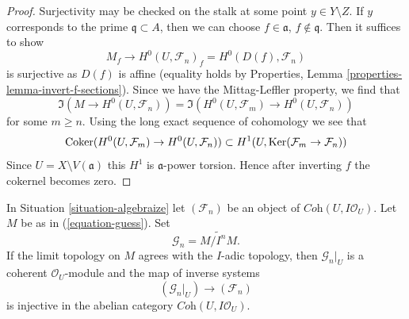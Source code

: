 \begin{proof}
Surjectivity may be checked on the stalk at some point $y \in Y \setminus Z$.
If $y$ corresponds to the prime $\mathfrak q \subset A$, then we can
choose $f \in \mathfrak a$, $f \not \in \mathfrak q$. Then it suffices
to show
$$
M_f \longrightarrow H^0(U, \mathcal{F}_n)_f = H^0(D(f), \mathcal{F}_n)
$$
is surjective as $D(f)$ is affine (equality holds by Properties,
Lemma \ref{properties-lemma-invert-f-sections}). Since we have the
Mittag-Leffler property, we find that
$$
\Im(M \to H^0(U, \mathcal{F}_n)) =
\Im(H^0(U, \mathcal{F}_m) \to H^0(U, \mathcal{F}_n))
$$
for some $m \geq n$. Using the long exact sequence of cohomology we see
that
$$
\mathop{\mathrm{Coker}}(H^0(U, \mathcal{F}_m) \to H^0(U, \mathcal{F}_n))
\subset
H^1(U, \mathop{\mathrm{Ker}}(\mathcal{F}_m \to \mathcal{F}_n))
$$
Since $U = X \setminus V(\mathfrak a)$ this $H^1$ is $\mathfrak a$-power
torsion. Hence after inverting $f$ the cokernel becomes zero.
\end{proof}

\begin{lemma}
\label{lemma-when-topology}
In Situation \ref{situation-algebraize} let $(\mathcal{F}_n)$ be an object
of $\textit{Coh}(U, I\mathcal{O}_U)$. Let $M$ be as in (\ref{equation-guess}).
Set
$$
\mathcal{G}_n = \widetilde{M/I^nM}.
$$
If the limit topology on $M$ agrees with the $I$-adic topology, then
$\mathcal{G}_n|_U$ is a coherent
$\mathcal{O}_U$-module and the map of inverse systems
$$
(\mathcal{G}_n|_U) \longrightarrow (\mathcal{F}_n)
$$
is injective in the abelian category $\textit{Coh}(U, I\mathcal{O}_U)$.
\end{lemma}

